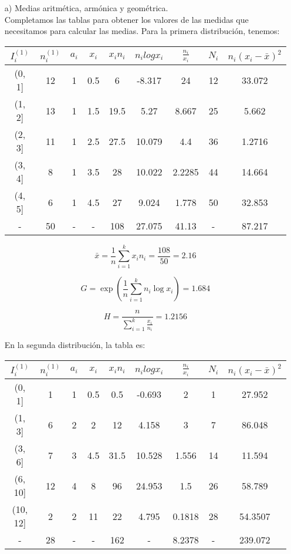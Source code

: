 \documentclass[a4paper,12pt]{article}
\begin{document}
\begin{itemize}
    \item[a)] Medias aritmética, armónica y geométrica.\\
Completamos las tablas para obtener los valores de las medidas que necesitamos para calcular las medias. Para la primera distribución, tenemos:
\begin{center}
    \begin{tabular}{|c|c|c|c|c|c|c|c|c|}
        \hline
        $I_i^{(1)}$ & $n_i^{(1)}$ & $a_i$ & $x_i$ & $x_in_i$ & $n_ilogx_i$ & $\frac{n_i}{x_i}$ & $N_i$ & $n_i(x_i-\bar x)^2$ \\
        \hline
        (0, 1] & 12 & 1 & 0.5 & 6 & -8.317 & 24 & 12 & 33.072\\
        (1, 2] & 13 & 1 & 1.5 & 19.5 & 5.27 & 8.667 & 25 & 5.662\\
        (2, 3] & 11 & 1 & 2.5 & 27.5 & 10.079 & 4.4 & 36 & 1.2716\\
        (3, 4] & 8 & 1 & 3.5 & 28 & 10.022 & 2.2285 & 44 & 14.664\\
        (4, 5] & 6 & 1 & 4.5 & 27 & 9.024 & 1.778 & 50 & 32.853\\
        - & 50 & - & - & 108  & 27.075 & 41.13 & - & 87.217 \\
        \hline
    \end{tabular}
\end{center}

    $$\bar x = \frac {1}{n} \sum\limits_{i = 1}^k {x_i n_i} = \frac{108}{50} = 2.16 $$

    $$G = \exp\left(\frac{1}{n} \sum\limits_{i = 1}^k n_i \log x_i\right) = 1.684$$

    $$H = \frac{n}{\sum\limits_{i = 1}^k \frac{x_i}{n_i}} = 1.2156$$

    En la segunda distribución, la tabla es:
    \begin{center}
    \begin{tabular}{|c|c|c|c|c|c|c|c|c|}
        \hline
        $I_i^{(1)}$ & $n_i^{(1)}$ & $a_i$ & $x_i$ & $x_in_i$ & $n_ilogx_i$ & $\frac{n_i}{x_i}$ & $N_i$ & $n_i(x_i-\bar x)^2$ \\
        \hline
        (0, 1] & 1 & 1 & 0.5 & 0.5 & -0.693 & 2 & 1 & 27.952\\
        (1, 3] & 6 & 2 & 2 & 12 & 4.158 & 3 & 7 & 86.048\\
        (3, 6] & 7 & 3 & 4.5 & 31.5 & 10.528 & 1.556 & 14 & 11.594\\
        (6, 10] & 12 & 4 & 8 & 96 & 24.953 & 1.5 & 26 & 58.789\\
        (10, 12] & 2 & 2 & 11 & 22 & 4.795 & 0.1818 & 28 & 54.3507\\
        - & 28 & - & - & 162  & - & 8.2378 & - & 239.072 \\
        \hline
    \end{tabular}
\end{center}


\end{itemize}
\end{document}

